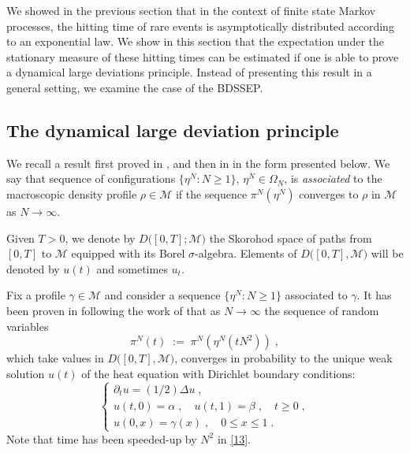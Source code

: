 \documentclass[reqno]{amsart}
\begin{document}
We showed in the previous section that in the context of finite state
Markov processes, the hitting time of rare events is asymptotically
distributed according to an exponential law. We show in this section
that the expectation under the stationary measure of these hitting
times can be estimated if one is able to prove a dynamical large
deviations principle. Instead of presenting this result in a general
setting, we examine the case of the BDSSEP.

\subsection*{The dynamical large deviation principle}

We recall a result first proved in \cite{bdgjl3}, and then in
\cite{blm1} in the form presented below. We say that sequence of
configurations $\{\eta^N : N\ge 1\}$, $\eta^N\in \Omega_N$, is
\emph{associated} to the macroscopic density profile $\rho\in{{\mathscr M}}$ if
the sequence $\pi^N(\eta^N)$ converges to $\rho$ in ${{\mathscr M}}$ as
$N\to\infty$.

Given $T>0$, we denote by $D\big([0,T];{{\mathscr M}}\big)$ the Skorohod space
of paths from $[0,T]$ to ${{\mathscr M}}$ equipped with its Borel
$\sigma$-algebra. Elements of $D\big([0,T], {{\mathscr M}}\big)$ will be
denoted by $u(t)$ and sometimes $u_t$.  

Fix a profile $\gamma\in {{\mathscr M}}$ and consider a sequence $\{\eta^N :
N\ge 1\}$ associated to $\gamma$. It has been proven in
\cite{els2,klo2} following the work of \cite{dv, kov} that as
$N\to\infty$ the sequence of random variables
\begin{equation}
\label{13}
\pi^N(t) \;:=\; \pi^N(\eta^N (t N^2))\;,
\end{equation}
which take values in $D\big([0,T], {{\mathscr M}}\big)$, converges in
probability to the unique weak solution $u(t)$ of the heat equation
with Dirichlet boundary conditions:
\begin{equation}
\label{09}
\left\{
\begin{array}{l}
\partial_t u = (1/2) \Delta u \;, \\
u(t,0) = \alpha\;, \quad u(t,1) = \beta \;, \quad t\ge 0\;, \\
u(0,x) = \gamma(x) \;, \quad 0\le x\le 1 \;.
\end{array}
\right. 
\end{equation}
Note that time has been speeded-up by $N^2$ in \eqref{13}.  
\end{document}
